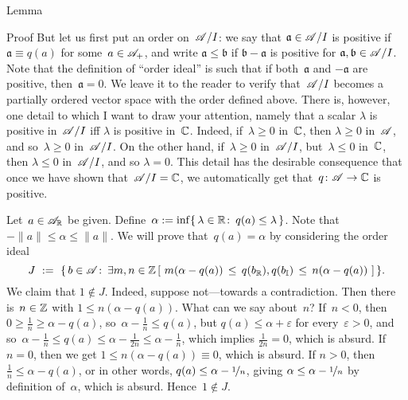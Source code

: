 \documentclass[a]{subfiles}
\begin{document}
\begin{parsec}
\begin{point}{Lemma}
\begin{point}{Proof}
But let us first put an order on~$\mathscr{A}/I$:
we say that $\mathfrak{a}\in \mathscr{A}/I$ is positive
if $\mathfrak{a}\equiv q(a)$ for some~$a\in\mathscr{A}_{+}$,
and write $\mathfrak{a}\leq \mathfrak{b}$ 
if $\mathfrak{b}-\mathfrak{a}$ is positive
for $\mathfrak{a},\mathfrak{b}\in\mathscr{A}/I$.
Note that the definition of ``order ideal'' is such
that if both~$\mathfrak{a}$ and $-\mathfrak{a}$ are positive,
then~$\mathfrak{a}=0$.
We leave it to the reader to verify 
that~$\mathscr{A}/I$ becomes a partially ordered vector space
with the order defined above.
There is, however,
one detail to which I want to draw your attention,
namely that a scalar $\lambda$ is positive in~$\mathscr{A}/I$
iff $\lambda$ is positive in~$\mathbb{C}$.
Indeed, if~$\lambda\geq 0$ in~$\mathbb{C}$,
then $\lambda\geq 0$ in~$\mathscr{A}$, and so~$\lambda \geq 0$ in~$\mathscr{A}/I$.
On the other hand,
if~$\lambda\geq 0$ in~$\mathscr{A}/I$, but~$\lambda\leq 0$ in~$\mathbb{C}$,
then $\lambda\leq 0$ in~$\mathscr{A}/I$,
and so $\lambda=0$.
This detail
has the desirable consequence
that once we have shown that~$\mathscr{A}/I=\mathbb{C}$,
we automatically get that~$q\colon \mathscr{A}\to\mathbb{C}$ is positive.

\begin{point}%
Let~$a\in \mathscr{A}_{\mathbb{R}}$ be given.
Define~$\alpha := \inf\{\,\lambda\in\mathbb{R}\colon\, q(a)\leq \lambda\,\}$.
Note that $-\|a\| \leq \alpha\leq \|a\|$.
We will prove that~$q(a)=\alpha$
by considering the order ideal
\begin{equation*}
J\ := \ \{\,b\in \scrA\colon\, \exists m,n\in \Z\,[\ 
m(\alpha-q(a)) \,\leq\, q(\Real{b}),q(\Imag{b})\,\leq\, n(\alpha-q(a))\ ]\,\}.
\end{equation*}
We claim that $1\notin J$.
Indeed, suppose not---towards a contradiction.
Then there is~$n\in \mathbb{Z}$
with $1\leq n(\alpha-q(a))$.
What can we say about~$n$?
If~$n<0$,
then $0\geq \frac{1}{n}\geq \alpha-q(a)$,
so~$\alpha-\frac{1}{n} \leq q(a)$,
but $q(a)\leq \alpha+\varepsilon$
for every~$\varepsilon>0$,
and so~$\alpha-\frac{1}{n}\leq q(a)\leq \alpha-\frac{1}{2n}
\leq \alpha-\frac{1}{n}$,
which implies $\frac{1}{2n}=0$,
which is absurd.
If $n=0$,
then we get $1\leq n(\alpha-q(a))\equiv 0$, which is absurd.
If $n> 0$,
then $\frac{1}{n}\leq \alpha-q(a)$,
or in other words,
 $q(a) \leq \alpha - \nicefrac{1}{n}$,
giving $\alpha \leq \alpha-\nicefrac{1}{n}$
by definition of~$\alpha$,
which is absurd.
Hence~$1\notin J$.


\end{point}
\end{point}
\end{point}
\end{parsec}
\end{document}
